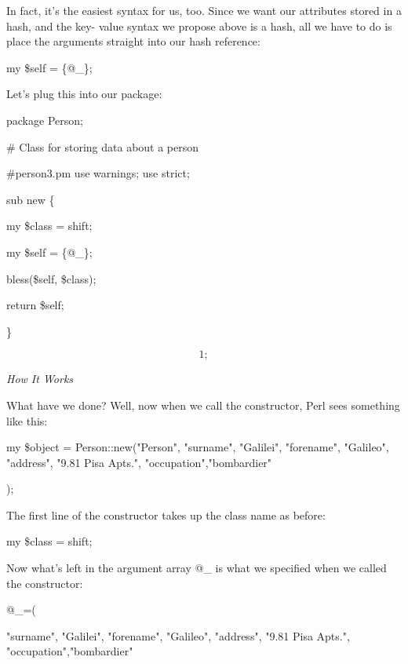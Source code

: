 \documentclass[a4paper,11pt]{book}
\begin{document}
\noindent 

\noindent In  fact,  it's the easiest  syntax  for  us,  too.  Since  we  want  our  attributes  stored  in  a  hash,  and  the  key- value  syntax we propose above  is  a  hash,  all  we have  to  do  is  place  the arguments  straight  into  our hash reference:

\noindent 

\noindent my \$self = \{@\_\};

\noindent 

\noindent Let's plug this into our package:

\noindent 

\noindent package Person;

\noindent \# Class for storing data about a person

\noindent \#person3.pm use warnings; use strict;

\noindent 

\noindent sub new \{

\noindent my \$class = shift;

\noindent my \$self = \{@\_\};

\noindent bless(\$self, \$class);

\noindent return \$self;

\noindent \}

\noindent 

\[1;\] 


\noindent \textit{How It Works}

\noindent What have we done? Well, now when we call the constructor, Perl sees something like this:

\noindent 

\noindent my \$object = Person::new("Person", "surname", "Galilei", "forename",  "Galileo", "address", "9.81 Pisa Apts.", "occupation","bombardier"

\noindent );

\noindent 

\noindent The first line of the constructor takes up the class name as before:

\noindent 

\noindent my \$class = shift;

\noindent 

\noindent Now what's left in the argument array @\_ is what we specified when we called the constructor:

\noindent 

\noindent @\_=(

\noindent "surname", "Galilei", "forename",  "Galileo", "address", "9.81 Pisa Apts.", "occupation","bombardier"
\end{document}
